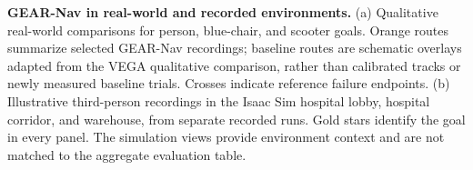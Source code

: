 \textbf{GEAR-Nav in real-world and recorded environments.}
(a) Qualitative real-world comparisons for person, blue-chair, and scooter
goals. Orange routes summarize selected GEAR-Nav recordings; baseline routes
are schematic overlays adapted from the VEGA qualitative comparison, rather
than calibrated tracks or newly measured baseline trials. Crosses indicate
reference failure endpoints.
(b) Illustrative third-person recordings in the Isaac Sim hospital lobby,
hospital corridor, and warehouse, from separate recorded runs.
Gold stars identify the goal in every panel. The simulation views provide
environment context and are not matched to the aggregate evaluation table.
